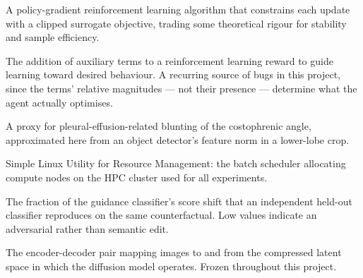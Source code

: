 \begin{description}[leftmargin=0pt,style=unboxed,itemsep=6pt]
\item[PPO (Proximal Policy Optimization)] A policy-gradient reinforcement
learning algorithm that constrains each update with a clipped surrogate
objective, trading some theoretical rigour for stability and sample
efficiency.

\item[Reward shaping] The addition of auxiliary terms to a reinforcement
learning reward to guide learning toward desired behaviour. A recurring
source of bugs in this project, since the terms' relative magnitudes ---
not their presence --- determine what the agent actually optimises.

\item[SCP (Costophrenic-recess score)] A proxy for pleural-effusion-related
blunting of the costophrenic angle, approximated here from an object
detector's feature norm in a lower-lobe crop.

\item[SLURM] Simple Linux Utility for Resource Management: the batch
scheduler allocating compute nodes on the HPC cluster used for all
experiments.

\item[Transfer ratio] The fraction of the guidance classifier's score
shift that an independent held-out classifier reproduces on the same
counterfactual. Low values indicate an adversarial rather than semantic
edit.

\item[VAE (Variational Autoencoder)] The encoder-decoder pair mapping
images to and from the compressed latent space in which the diffusion
model operates. Frozen throughout this project.

\end{description}

\clearpage
